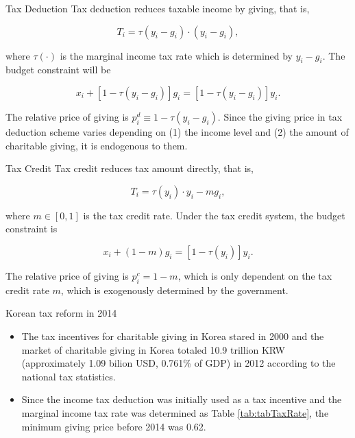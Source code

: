 \documentclass[
  ignorenonframetext,
]{beamer}
\providecommand{\tightlist}{%
  \setlength{\itemsep}{0pt}\setlength{\parskip}{0pt}}
\begin{document}
\begin{frame}{Tax Deduction}
\protect\hypertarget{tax-deduction}{}
Tax deduction reduces taxable income by giving, that is,

\[
    T_i = \tau(y_i - g_i) \cdot (y_i - g_i),
\]

where \(\tau(\cdot)\) is the marginal income tax rate which is determined by \(y_i - g_i\). The budget constraint will be

\[
    x_i + [1 - \tau(y_i - g_i)]g_i = [1 - \tau(y_i - g_i)] y_i.
\]

The relative price of giving is \(p_i^{d} \equiv 1 - \tau(y_i - g_i)\).
Since the giving price in tax deduction scheme varies depending on (1) the income level and (2) the amount of charitable giving, it is endogenous to them.
\end{frame}

\begin{frame}{Tax Credit}
\protect\hypertarget{tax-credit}{}
Tax credit reduces tax amount directly, that is,

\[
    T_i = \tau(y_i)\cdot y_i - m g_i,
\]

where \(m \in [0, 1]\) is the tax credit rate. Under the tax credit system, the budget constraint is

\[
    x_i + (1 - m) g_i = [1 - \tau(y_i)] y_i.
\]

The relative price of giving is \(p_i^c = 1 - m\),
which is only dependent on the tax credit rate \(m\), which is exogenously determined by the government.
\end{frame}

\begin{frame}{Korean tax reform in 2014}
\protect\hypertarget{korean-tax-reform-in-2014}{}
\begin{itemize}
\tightlist
\item
  The tax incentives for charitable giving in Korea stared in 2000 and the market of charitable giving in Korea totaled 10.9 trillion KRW (approximately 1.09 bilion USD, 0.761\% of GDP) in 2012 according to the national tax statistics.
\item
  Since the income tax deduction was initially used as a tax incentive and the marginal income tax rate was determined as Table \ref{tab:tabTaxRate}, the minimum giving price before 2014 was 0.62.
\end{itemize}
\end{frame}
\end{document}
